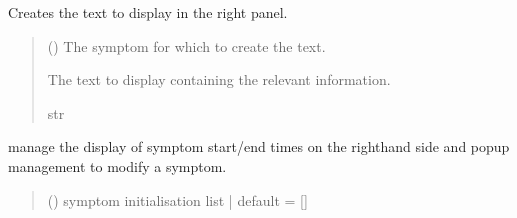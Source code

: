 \documentclass[letterpaper,10pt,english]{sphinxmanual}
\begin{document}
\begin{fulllineitems}
\begin{fulllineitems}
\label{\detokenize{general_interface:general_interface.InterfaceGenerale.text_sympt}}
\pysigstartsignatures
{}
\pysigstopsignatures
\sphinxAtStartPar
Creates the text to display in the right panel.
\begin{quote}\begin{description}
\sphinxAtStartPar
{} ({\hyperref[\detokenize{annotation:annotation.class_symptome.Symptome}]{}}) \textendash{} The symptom for which to create the text.

\sphinxAtStartPar
The text to display containing the relevant information.

\sphinxAtStartPar
str

\end{description}\end{quote}

\end{fulllineitems}


\begin{fulllineitems}
\label{\detokenize{general_interface:general_interface.InterfaceGenerale.update_right_panel}}
\pysigstartsignatures
{}
\pysigstopsignatures
\sphinxAtStartPar
manage the display of symptom start/end times on the right\sphinxhyphen{}hand side and pop\sphinxhyphen{}up management to modify a symptom.
\begin{quote}\begin{description}
\sphinxAtStartPar
{} () \textendash{} symptom initialisation list | default = {[}{]}

\end{description}\end{quote}

\end{fulllineitems}


\end{fulllineitems}
\end{document}
